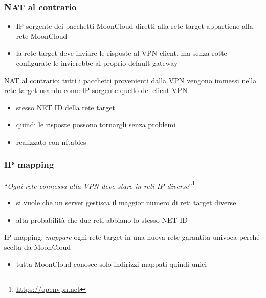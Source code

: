 \begin{frame}
	\frametitle{NAT al contrario}
		
	\begin{itemize}
		\item IP sorgente dei pacchetti MoonCloud diretti alla rete target
		      appartiene alla rete MoonCloud
		\item la rete target deve inviare le risposte al VPN client, ma senza
		      rotte configurate le invierebbe al proprio default gateway
	\end{itemize}
		
	\alert{NAT al contrario}: tutti i pacchetti provenienti dalla VPN vengono
	immessi nella rete target usando come IP sorgente quello del client VPN
	\begin{itemize}
		\item stesso NET ID della rete target
		\item quindi le risposte possono tornargli senza problemi
		\item realizzato con \alert{nftables}
	\end{itemize}
\end{frame}

\begin{frame}
	\frametitle{IP mapping}
	``\textit{Ogni rete connessa alla VPN deve stare in reti IP diverse}''\footnote{\url{https://openvpn.net}}
	\begin{itemize}
		\item si vuole che un server gestisca il maggior numero di reti target diverse
		\item alta probabilità che due reti abbiano lo stesso NET ID
	\end{itemize}
		
	\alert{IP mapping}: \textit{mappare} ogni rete target in una nuova rete
	\alert{garantita univoca} perché scelta da MoonCloud
	\begin{itemize}
		\item tutta MoonCloud conosce solo indirizzi mappati quindi unici
	\end{itemize}
\end{frame}

